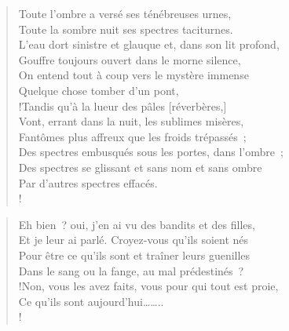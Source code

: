 \documentclass[french,twoside]{book} %
\newcommand{\astertri}{\medskip\par\centerline{\color{rubric}\large\selectfont{\syms ✻\,✻\,✻}}\medskip\par}%
\newcommand\corr[1]{#1}
\newenvironment{quoteblock}%
  {\begin{quoting}}
  {\end{quoting}}
\newenvironment{quotebar}{%
    \def\FrameCommand{{\color{rubric!10!}\vrule width 0.5em} \hspace{0.9em}}%
    \def\OuterFrameSep{\itemsep} %
    \MakeFramed {\advance\hsize-\width \FrameRestore}
  }%
  {%
    \endMakeFramed
  }
\renewenvironment{quoteblock}%
  {%
    \savenotes
    \setstretch{0.9}
    \normalfont
    \begin{quotebar}
  }
  {%
    \end{quotebar}
    \spewnotes
  }
\begin{document}
\begin{verse}
Toute l’ombre a versé ses ténébreuses urnes,\\
Toute la sombre nuit ses spectres taciturnes.\\
L’eau dort sinistre et glauque et, dans son lit profond, \\
Gouffre toujours ouvert dans le morne silence,\\
On entend tout à coup vers le mystère immense\\
\hspace{1em}\hspace{1em}Quelque chose tomber d’un pont,\\!Tandis qu’à la lueur des pâles [{\corr réverbères,}]\\
Vont, errant dans la nuit, les sublimes misères,\\
Fantômes plus affreux que les froids trépassés ;\\
Des spectres embusqués sous les portes, dans l’ombre ;\\
Des spectres se glissant et sans nom et sans ombre\\
\hspace{1em}\hspace{1em}Par d’autres spectres effacés.\\!
\end{verse}
\begin{quoteblock}

\astertri

\end{quoteblock}

\begin{verse}
Eh bien ? oui, j’en ai vu des bandits et des filles,\\
Et je leur ai parlé. Croyez-vous qu’ils soient nés\\
Pour être ce qu’ils sont et traîner leurs guenilles\\
Dans le sang ou la fange, au mal prédestinés ?\\!Non, vous les avez faits, vous pour qui tout est proie,\\
Ce qu’ils sont aujourd’hui……..\\!
\end{verse}
\end{document}
